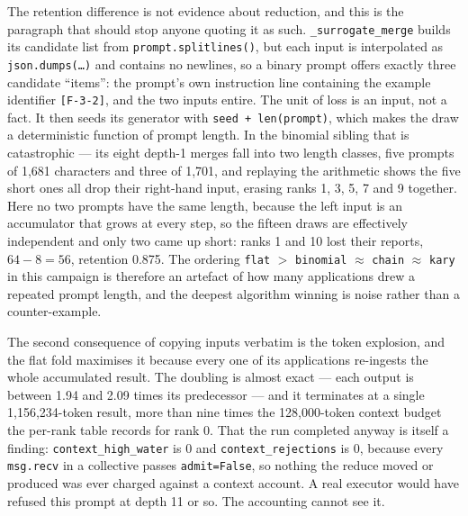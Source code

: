 \documentclass[11pt]{article}
\begin{document}
The retention difference is not evidence about reduction, and this is the paragraph that
should stop anyone quoting it as such. \texttt{\_surrogate\_merge} builds its candidate list
from \texttt{prompt.splitlines()}, but each input is interpolated as
\texttt{json.dumps(\dots)} and contains no newlines, so a binary prompt offers exactly three
candidate ``items'': the prompt's own instruction line containing the example identifier
\texttt{[F-3-2]}, and the two inputs entire. The unit of loss is an input, not a fact.
It then seeds its generator with \texttt{seed + len(prompt)}, which makes the draw a
deterministic function of prompt length. In the binomial sibling that is catastrophic ---
its eight depth-1 merges fall into two length classes, five prompts of 1{,}681 characters
and three of 1{,}701, and replaying the arithmetic shows the five short ones all drop their
right-hand input, erasing ranks 1, 3, 5, 7 and 9 together. Here no two prompts have the same
length, because the left input is an accumulator that grows at every step, so the fifteen
draws are effectively independent and only two came up short: ranks 1 and 10 lost their
reports, $64 - 8 = 56$, retention 0.875. The ordering \texttt{flat} $>$ \texttt{binomial}
$\approx$ \texttt{chain} $\approx$ \texttt{kary} in this campaign is therefore an artefact of
how many applications drew a repeated prompt length, and the deepest algorithm winning is
noise rather than a counter-example.

The second consequence of copying inputs verbatim is the token explosion, and the flat fold
maximises it because every one of its applications re-ingests the whole accumulated result.
The doubling is almost exact --- each output is between 1.94 and 2.09 times its predecessor
--- and it terminates at a single 1{,}156{,}234-token result, more than nine times the
128{,}000-token context budget the per-rank table records for rank 0. That the run completed
anyway is itself a finding: \texttt{context\_high\_water} is 0 and
\texttt{context\_rejections} is 0, because every \texttt{msg.recv} in a collective passes
\texttt{admit=False}, so nothing the reduce moved or produced was ever charged against a
context account. A real executor would have refused this prompt at depth 11 or so. The
accounting cannot see it.
\end{document}
